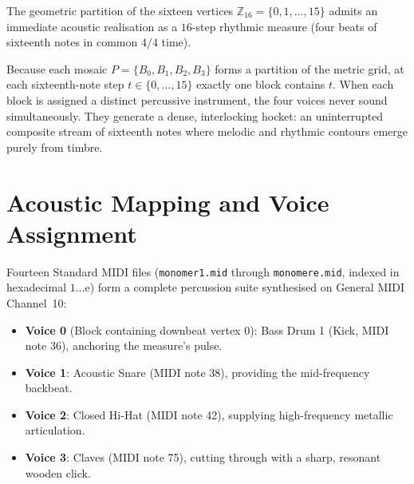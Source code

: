 
The geometric partition of the sixteen vertices $\mathbb{Z}_{16} = \{0, 1, \dots, 15\}$ admits an immediate acoustic realisation as a $16$-step rhythmic measure (four beats of sixteenth notes in common $4/4$ time).

Because each mosaic $P = \{B_0, B_1, B_2, B_3\}$ forms a partition of the metric grid, at each sixteenth-note step $t \in \{0, \dots, 15\}$ exactly one block contains $t$. When each block is assigned a distinct percussive instrument, the four voices never sound simultaneously. They generate a dense, interlocking hocket: an uninterrupted composite stream of sixteenth notes where melodic and rhythmic contours emerge purely from timbre.

\section{Acoustic Mapping and Voice Assignment}
\label{sec:percussion-suite}

Fourteen Standard MIDI files (\texttt{monomer1.mid} through \texttt{monomere.mid}, indexed in hexadecimal $1 \dots \text{e}$) form a complete percussion suite synthesised on General MIDI Channel~10:
\begin{itemize}
    \item \textbf{Voice 0} (Block containing downbeat vertex $0$): Bass Drum 1 (Kick, MIDI note 36), anchoring the measure's pulse.
    \item \textbf{Voice 1}: Acoustic Snare (MIDI note 38), providing the mid-frequency backbeat.
    \item \textbf{Voice 2}: Closed Hi-Hat (MIDI note 42), supplying high-frequency metallic articulation.
    \item \textbf{Voice 3}: Claves (MIDI note 75), cutting through with a sharp, resonant wooden click.
\end{itemize}

